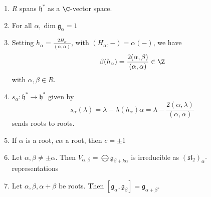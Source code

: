 \documentclass[x11names,reqno,14pt]{extarticle}
\newcommand{\mk}[1]{\mathfrak{#1}}
\newcommand{\g}{\mk{g}}
\newcommand{\h}{\mk{h}}
\renewcommand{\sl}{\mk{s}\mk{l}}
\begin{document}
\begin{enumerate}

\item $R$ spans $\h^*$ as a $\C$-vector space. 

\item For all $\alpha, \dim \g_\alpha = 1$

\item Setting $h_\alpha = \frac{2H_\alpha}{(\alpha,\alpha)}$, with $(H_\alpha,-) = \alpha(-)$, we have
\[
\beta(h_\alpha) = \frac{2(\alpha,\beta)}{(\alpha,\alpha)} \in \Z
\]
with $\alpha,\beta \in R$. 

\item $s_\alpha: \h^*\to\h^*$ given by 
\[
s_\alpha(\lambda) = \lambda - \lambda(h_\alpha)\alpha = \lambda - \frac{2(\alpha,\lambda)}{(\alpha,\alpha)}
\]
sends roots to roots. 

\item If $\alpha$ is a root, $c\alpha$ a root, then $c = \pm 1$

\item Let $\alpha,\beta \neq \pm \alpha$. Then $V_{\alpha,\beta} = \bigoplus \g_{\beta+k\alpha}$ is irreducible as $(\sl_2)_\alpha$-representations

\item Let $\alpha,\beta, \alpha+\beta$ be roots. Then $[\g_\alpha,\g_\beta] = \g_{\alpha+\beta}$. 

\end{enumerate}
\end{document}
